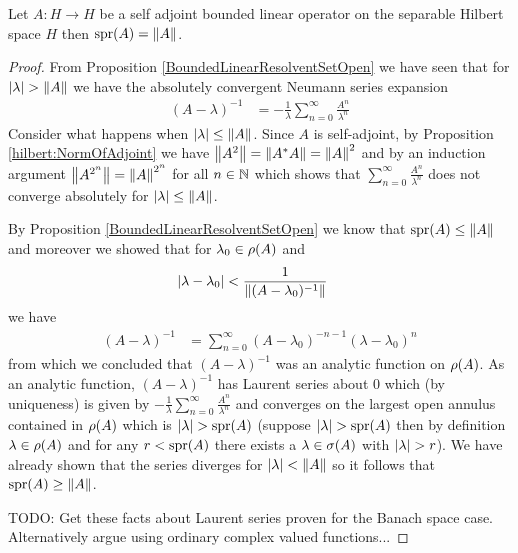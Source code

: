 \begin{prop}\label{hilbert:SpectralRadiusBoundedSelfAdjoint}Let $A : H \to H$ be a self adjoint bounded linear operator on the separable Hilbert space $H$ then $\operatorname*{spr}(A) = \left \lVert A \right \rVert$.
\end{prop}
\begin{proof}
From Proposition \ref {BoundedLinearResolventSetOpen} we have seen that for $\left \vert \lambda \right \vert > \left \lVert A \right \rVert$ we have the absolutely convergent Neumann series expansion
\begin{align*}
(A - \lambda)^{-1} &= -\frac{1}{\lambda} \sum_{n=0}^\infty \frac{A^n}{\lambda^n}
\end{align*}
Consider what happens when $\left \vert \lambda \right \vert \leq \left \lVert A \right \rVert$.  Since $A$ is self-adjoint, by Proposition \ref{hilbert:NormOfAdjoint} we have $\left \lVert A^2 \right \rVert = \left \lVert {A}^*A \right \rVert = \left \lVert A \right \rVert^2$ and by an induction argument $\left \lVert A^{2^n} \right \rVert = \left \lVert A \right \rVert^{2^n}$ for all $n \in \mathbb{N}$ which shows that $\sum_{n=0}^\infty \frac{A^n}{\lambda^n}$  does not converge absolutely for $\left \vert \lambda \right \vert \leq \left \lVert A \right \rVert$.  

By Proposition \ref {BoundedLinearResolventSetOpen} we know that $\operatorname*{spr}(A) \leq \left \lVert A \right \rVert$ and moreover we showed that for $\lambda_0 \in \rho(A)$ and 
\begin{align*}
\left \vert \lambda - \lambda_0 \right \vert  &< \frac{1}{\left \lVert (A-\lambda_0)^{-1} \right \rVert}
\end{align*}
we have 
\begin{align*}
(A - \lambda)^{-1} &= \sum_{n=0}^\infty (A- \lambda_0)^{-n-1} (\lambda - \lambda_0)^n
\end{align*}
from which we concluded that $(A - \lambda)^{-1}$ was an analytic function on $\rho(A)$.  As an analytic function, $(A - \lambda)^{-1}$ has Laurent series about $0$ which (by uniqueness) is given by $-\frac{1}{\lambda} \sum_{n=0}^\infty \frac{A^n}{\lambda^n}$ and converges on the largest open annulus contained in $\rho(A)$ which is $\left \vert \lambda \right \vert > \operatorname*{spr}(A)$ (suppose $\left \vert \lambda \right \vert >  \operatorname*{spr}(A)$ then by definition  $\lambda \in \rho(A)$ and for any $r < \operatorname*{spr}(A)$ there exists a $\lambda \in \sigma(A)$ with $\left \vert \lambda \right \vert > r$).  We have already shown that the series diverges for $\left \vert \lambda \right \vert < \left \lVert A \right \rVert$ so it follows that $\operatorname*{spr}(A) \geq \left \lVert A \right \rVert$.   

TODO:  Get these facts about Laurent series proven for the Banach space case.  Alternatively argue using ordinary complex valued functions...
\end{proof}

